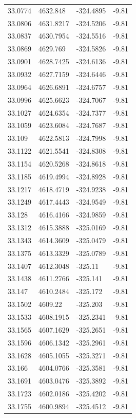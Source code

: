 \begin{table}[H]
\begin{tabular}{llll}
33.0774 & 4632.848 & -324.4895 & -9.81 \\
33.0806 & 4631.8217 & -324.5206 & -9.81 \\
33.0837 & 4630.7954 & -324.5516 & -9.81 \\
33.0869 & 4629.769 & -324.5826 & -9.81 \\
33.0901 & 4628.7425 & -324.6136 & -9.81 \\
33.0932 & 4627.7159 & -324.6446 & -9.81 \\
33.0964 & 4626.6891 & -324.6757 & -9.81 \\
33.0996 & 4625.6623 & -324.7067 & -9.81 \\
33.1027 & 4624.6354 & -324.7377 & -9.81 \\
33.1059 & 4623.6084 & -324.7687 & -9.81 \\
33.109 & 4622.5813 & -324.7998 & -9.81 \\
33.1122 & 4621.5541 & -324.8308 & -9.81 \\
33.1154 & 4620.5268 & -324.8618 & -9.81 \\
33.1185 & 4619.4994 & -324.8928 & -9.81 \\
33.1217 & 4618.4719 & -324.9238 & -9.81 \\
33.1249 & 4617.4443 & -324.9549 & -9.81 \\
33.128 & 4616.4166 & -324.9859 & -9.81 \\
33.1312 & 4615.3888 & -325.0169 & -9.81 \\
33.1343 & 4614.3609 & -325.0479 & -9.81 \\
33.1375 & 4613.3329 & -325.0789 & -9.81 \\
33.1407 & 4612.3048 & -325.11 & -9.81 \\
33.1438 & 4611.2766 & -325.141 & -9.81 \\
33.147 & 4610.2484 & -325.172 & -9.81 \\
33.1502 & 4609.22 & -325.203 & -9.81 \\
33.1533 & 4608.1915 & -325.2341 & -9.81 \\
33.1565 & 4607.1629 & -325.2651 & -9.81 \\
33.1596 & 4606.1342 & -325.2961 & -9.81 \\
33.1628 & 4605.1055 & -325.3271 & -9.81 \\
33.166 & 4604.0766 & -325.3581 & -9.81 \\
33.1691 & 4603.0476 & -325.3892 & -9.81 \\
33.1723 & 4602.0186 & -325.4202 & -9.81 \\
33.1755 & 4600.9894 & -325.4512 & -9.81 \\

\end{tabular}
\end{table}
